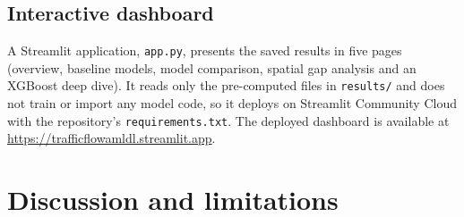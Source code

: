 \documentclass[11pt,a4paper]{article}
\newcommand{\dashboard}{\url{https://trafficflowamldl.streamlit.app}}
\begin{document}
\subsection{Interactive dashboard}
A Streamlit application, \texttt{app.py}, presents the saved results in five pages (overview, baseline models, model comparison, spatial gap analysis and an XGBoost deep dive).
It reads only the pre-computed files in \texttt{results/} and does not train or import any model code, so it deploys on Streamlit Community Cloud with the repository's \texttt{requirements.txt}.
The deployed dashboard is available at \dashboard.

\section{Discussion and limitations}\label{sec:discussion}
\end{document}
